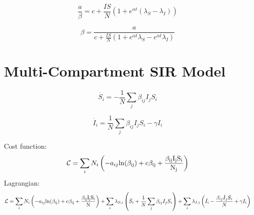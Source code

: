 \documentclass[11pt]{article} %
\begin{document}
\begin{equation}
\frac{a}{\beta} = c+\frac{IS}{N}(1+e^{\alpha t}(\lambda_S-\lambda_I))
\end{equation}

\begin{equation}
\beta = \frac{a}{c+\frac{IS}{N}(1+e^{\alpha t}\lambda_S-e^{\alpha t}\lambda_I)}
\end{equation}

\section{Multi-Compartment SIR Model}
\begin{equation}
\dot{S_i} = -\frac{1}{N}\sum_j{\beta_{ij}I_jS_i}
\end{equation}

\begin{equation}
\dot{I_i} = \frac{1}{N}\sum_j{\beta_{ij}I_jS_i}-\gamma I_i
\end{equation}

Cost function:
\begin{equation}
\mathcal{C} =\sum_i N_i\left( -a_{ij}\rm{ln}({\beta_{ij}})+c\beta_{ij}+\frac{\beta_{ij}{I_jS_i}}{N_j}\right)
\end{equation}
Lagrangian:
\begin{equation}
\mathcal{L} = \sum_i N_i\left( -a_{ij}\rm{ln}({\beta_{ij}})+c\beta_{ij}+\frac{\beta_{ij}{I_jS_i}}{N}\right)+
\sum_i \lambda_{S,i}\left( \dot{S}_i+\frac{1}{N}\sum_j{\beta_{ij}I_jS_i}\right)+\sum_i \lambda_{I,i}\left(\dot{I}_i -\frac{\beta_{ij}I_jS_i}{N}+\gamma I_i  \right)
\end{equation}
\end{document}
